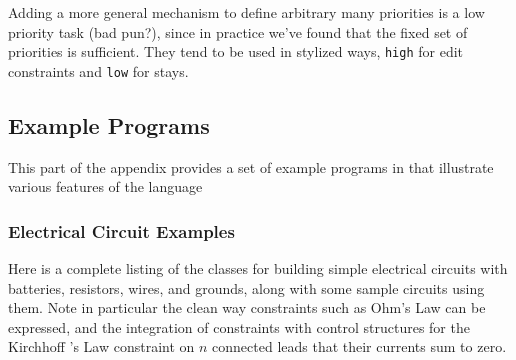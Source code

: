 Adding a more general mechanism to define arbitrary many priorities is
a low priority task (bad pun?), since in practice we've found that the
fixed set of priorities is sufficient.  They tend to be used in
stylized ways, \eg \lstinline{high} for edit constraints and
\lstinline{low} for stays.





\subsection{Example Programs}

This part of the appendix provides a set of example programs in
\toolname that illustrate various features of the language

\subsubsection{Electrical Circuit Examples}
\label{sec:electrical-circuits}

Here is a complete listing of the classes for building simple
electrical circuits with batteries, resistors, wires, and grounds,
along with some sample circuits using them.  Note in particular the
clean way constraints such as Ohm's Law can be expressed, and the
integration of constraints with control structures for the Kirchhoff 's
Law constraint on $n$ connected leads that their currents sum to zero.

